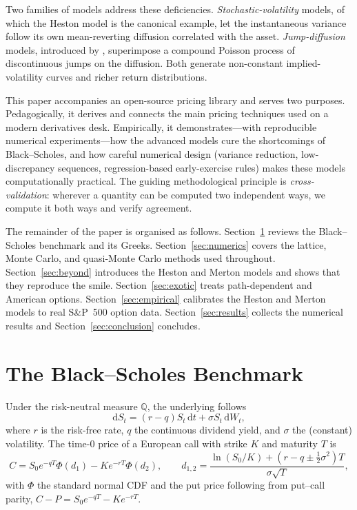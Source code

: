 \documentclass[11pt]{article}
\begin{document}
Two families of models address these deficiencies. \emph{Stochastic-volatility}
models, of which the Heston \citep{heston1993} model is the canonical example,
let the instantaneous variance follow its own mean-reverting diffusion correlated
with the asset. \emph{Jump-diffusion} models, introduced by
\citet{merton1976}, superimpose a compound Poisson process of discontinuous jumps
on the diffusion. Both generate non-constant implied-volatility curves and richer
return distributions.

This paper accompanies an open-source pricing library and serves two purposes.
Pedagogically, it derives and connects the main pricing techniques used on a
modern derivatives desk. Empirically, it demonstrates---with reproducible
numerical experiments---how the advanced models cure the shortcomings of
Black--Scholes, and how careful numerical design (variance reduction,
low-discrepancy sequences, regression-based early-exercise rules) makes these
models computationally practical. The guiding methodological principle is
\emph{cross-validation}: wherever a quantity can be computed two independent
ways, we compute it both ways and verify agreement.

The remainder of the paper is organised as follows.
Section~\ref{sec:bs} reviews the Black--Scholes benchmark and its Greeks.
Section~\ref{sec:numerics} covers the lattice, Monte Carlo, and quasi-Monte Carlo
methods used throughout. Section~\ref{sec:beyond} introduces the Heston and
Merton models and shows that they reproduce the smile. Section~\ref{sec:exotic}
treats path-dependent and American options. Section~\ref{sec:empirical} calibrates
the Heston and Merton models to real S\&P~500 option data. Section~\ref{sec:results}
collects the numerical results and Section~\ref{sec:conclusion} concludes.

\section{The Black--Scholes Benchmark}
\label{sec:bs}

Under the risk-neutral measure $\mathbb{Q}$, the underlying follows
\begin{equation}
\mathrm{d}S_t = (r-q) S_t\,\mathrm{d}t + \sigma S_t\,\mathrm{d}W_t,
\end{equation}
where $r$ is the risk-free rate, $q$ the continuous dividend yield, and $\sigma$
the (constant) volatility. The time-$0$ price of a European call with strike $K$
and maturity $T$ is
\begin{equation}
C = S_0 e^{-qT}\Phi(d_1) - K e^{-rT}\Phi(d_2), \qquad
d_{1,2} = \frac{\ln(S_0/K) + (r-q\pm\tfrac12\sigma^2)T}{\sigma\sqrt{T}},
\label{eq:bs}
\end{equation}
with $\Phi$ the standard normal CDF and the put price following from put--call
parity, $C - P = S_0 e^{-qT} - K e^{-rT}$.
\end{document}
